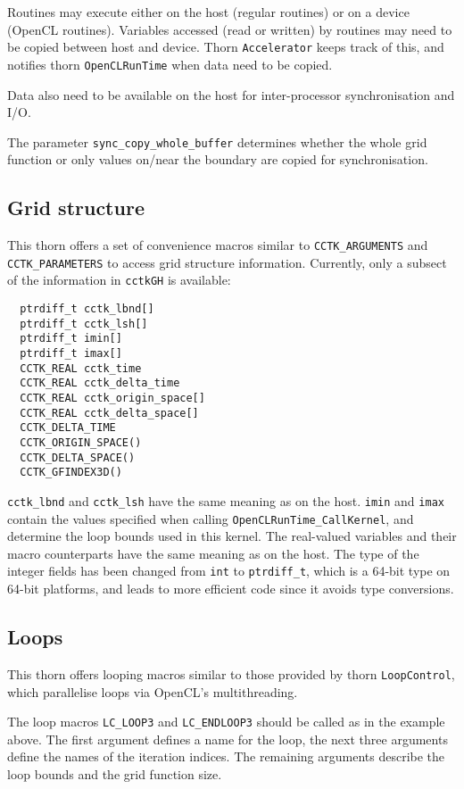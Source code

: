 Routines may execute either on the host (regular routines) or on a
device (OpenCL routines). Variables accessed (read or written) by
routines may need to be copied between host and device. Thorn
\texttt{Accelerator} keeps track of this, and notifies thorn
\texttt{OpenCLRunTime} when data need to be copied.

Data also need to be available on the host for inter-processor
synchronisation and I/O\@.

The parameter \texttt{sync\_copy\_whole\_buffer} determines whether
the whole grid function or only values on/near the boundary are copied
for synchronisation.

\subsection{Grid structure}

This thorn offers a set of convenience macros similar to
\texttt{CCTK\_ARGUMENTS} and \texttt{CCTK\_PARAMETERS} to access grid
structure information. Currently, only a subsect of the information in
\texttt{cctkGH} is available:

\begin{verbatim}
  ptrdiff_t cctk_lbnd[]
  ptrdiff_t cctk_lsh[]
  ptrdiff_t imin[]
  ptrdiff_t imax[]
  CCTK_REAL cctk_time
  CCTK_REAL cctk_delta_time
  CCTK_REAL cctk_origin_space[]
  CCTK_REAL cctk_delta_space[]
  CCTK_DELTA_TIME
  CCTK_ORIGIN_SPACE()
  CCTK_DELTA_SPACE()
  CCTK_GFINDEX3D()
\end{verbatim}

\texttt{cctk\_lbnd} and \texttt{cctk\_lsh} have the same meaning as on
the host. \texttt{imin} and \texttt{imax} contain the values specified
when calling \texttt{OpenCLRunTime\_CallKernel}, and determine the
loop bounds used in this kernel. The real-valued variables and their
macro counterparts have the same meaning as on the host. The type of
the integer fields has been changed from \texttt{int} to
\texttt{ptrdiff\_t}, which is a 64-bit type on 64-bit platforms, and
leads to more efficient code since it avoids type conversions.

\subsection{Loops}

This thorn offers looping macros similar to those provided by thorn
\texttt{LoopControl}, which parallelise loops via OpenCL's
multithreading.

The loop macros \texttt{LC\_LOOP3} and \texttt{LC\_ENDLOOP3} should be
called as in the example above. The first argument defines a name for
the loop, the next three arguments define the names of the iteration
indices. The remaining arguments describe the loop bounds and the
grid function size.

